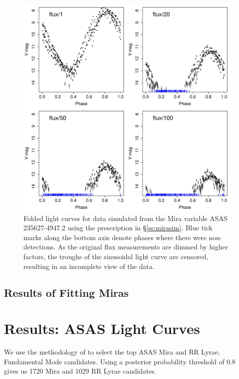 \documentclass[12pt,preprint]{aastex}
\begin{document}
\begin{figure}
\begin{center}
\includegraphics[angle=0,width=6.5in]{../plots/mira_simulated.pdf}
\end{center}
\caption{ Folded light curves for data simulated from the Mira variable ASAS 235627-4947.2 using the prescription in \S\ref{ss:mirasim}.  Blue tick marks along the bottom axis denote phases where there were non-detections.  As the original flux measurements are dimmed by higher factors, the troughs of the sinusoidal light curve are censored, resulting in an incomplete view of the data.  \label{fig:mirasim}}
\end{figure}


\subsection{Results of Fitting Miras}


\section{Results: ASAS Light Curves}
\label{sec:results}

We use the methodology of \cite{2011arXiv1106.2832R} to select the top ASAS Mira  and RR Lyrae, Fundamental Mode candidates.  Using a posterior probability threshold of 0.8 gives us 1720 Mira  and 1029 RR Lyrae candidates.
\end{document}
